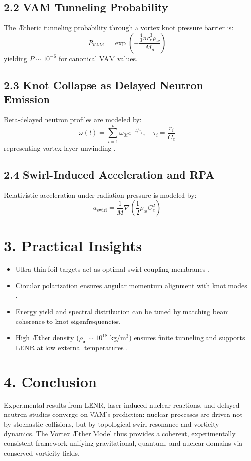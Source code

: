 \documentclass{article}
\begin{document}
\subsection*{2.2 VAM Tunneling Probability}
The \AE theric tunneling probability through a vortex knot pressure barrier is:
\[
P_{\mathrm{VAM}} = \exp\left( - \frac{\frac{4}{3} \pi r_c^3 \rho_{\text{\ae}}}{M_d} \right)
\]
yielding $P \sim 10^{-6}$ for canonical VAM values.

\subsection*{2.3 Knot Collapse as Delayed Neutron Emission}
Beta-delayed neutron profiles are modeled by:
\[
\omega(t) = \sum_{i=1}^n \omega_{0i} e^{-t/\tau_i}, \quad \tau_i = \frac{r_i}{C_e}
\]
representing vortex layer unwinding \cite{gold2023uncovering}.

\subsection*{2.4 Swirl-Induced Acceleration and RPA}
Relativistic acceleration under radiation pressure is modeled by:
\[
a_{\text{swirl}} = \frac{1}{M} \nabla \left( \frac{1}{2} \rho_{\text{\ae}} C_e^2 \right)
\]

\section*{3. Practical Insights}
\begin{itemize}
  \item Ultra-thin foil targets act as optimal swirl-coupling membranes \cite{zamfir2021eli}.
  \item Circular polarization ensures angular momentum alignment with knot modes \cite{zamfir2021eli}.
  \item Energy yield and spectral distribution can be tuned by matching beam coherence to knot eigenfrequencies.
  \item High \AE ther density ($\rho_{\text{\ae}} \sim 10^{18}$ kg/m$^3$) ensures finite tunneling and supports LENR at low external temperatures \cite{sinha2008laser}.
\end{itemize}

\section*{4. Conclusion}
Experimental results from LENR, laser-induced nuclear reactions, and delayed neutron studies converge on VAM's prediction: nuclear processes are driven not by stochastic collisions, but by topological swirl resonance and vorticity dynamics. The Vortex \AE ther Model thus provides a coherent, experimentally consistent framework unifying gravitational, quantum, and nuclear domains via conserved vorticity fields.



\end{document}
